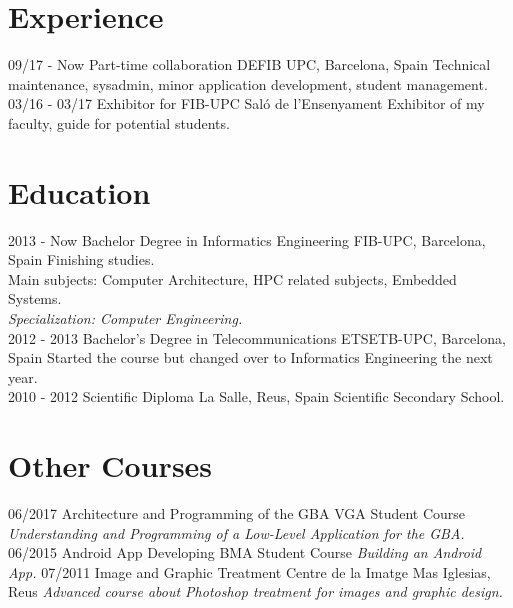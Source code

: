 \documentclass[]{friggeri-cv}
\begin{document}
\section{Experience}
\begin{entrylist}
  \entry
    {09/17 - Now}
    {Part-time collaboration}
    {DEFIB UPC, Barcelona, Spain}
    {Technical maintenance, sysadmin, minor application development, student management.\\}
  \entry
    {03/16 - 03/17}
    {Exhibitor for FIB-UPC}
    {Saló de l'Ensenyament}
    {Exhibitor of my faculty, guide for potential students.\\}
\end{entrylist}

\section{Education}
\begin{entrylist}
  \entry
    {2013 - Now}
    {Bachelor Degree in Informatics Engineering}
    {FIB-UPC, Barcelona, Spain}
    {Finishing studies.\\
    Main subjects: Computer Architecture, HPC related subjects, Embedded Systems.\\
    \emph{Specialization: Computer Engineering.}\\}
  \entry
    {2012 - 2013}
    {Bachelor's Degree in Telecommunications}
    {ETSETB-UPC, Barcelona, Spain}
    {Started the course but changed over to Informatics Engineering the next year.\\}
  \entry
    {2010 - 2012}
    {Scientific Diploma}
    {La Salle, Reus, Spain}
    {Scientific Secondary School.}
\end{entrylist}

\section{Other Courses}
\begin{entrylist}
  \entry
    {06/2017}
    {Architecture and Programming of the GBA}
    {VGA Student Course}
    {\emph{Understanding and Programming of a Low-Level Application for the GBA.}}
  \entry
    {06/2015}
    {Android App Developing}
    {BMA Student Course}
    {\emph{Building an Android App.}}
  \entry
    {07/2011}
    {Image and Graphic Treatment}
    {Centre de la Imatge Mas Iglesias, Reus}
    {\emph{Advanced course about Photoshop treatment for images and graphic design.}}
\end{entrylist}
\end{document}
